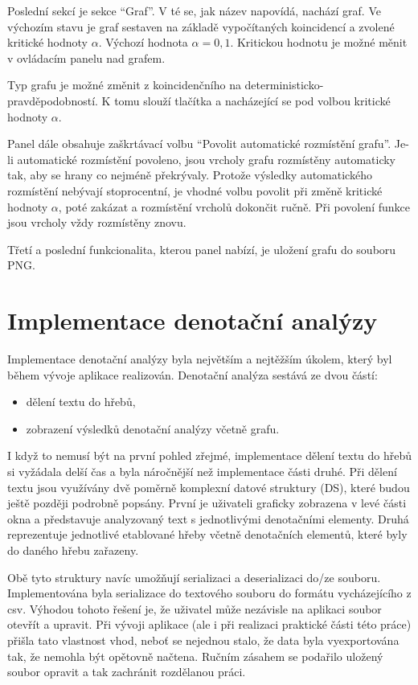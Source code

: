 \documentclass[dp.tex]{subfiles}
\begin{document}
Poslední sekcí je sekce \enquote{Graf}. V té se, jak název napovídá, nachází graf. Ve výchozím stavu je graf sestaven na základě vypočítaných koincidencí a zvolené kritické hodnoty $\alpha$. Výchozí hodnota $\alpha = 0,1$. Kritickou hodnotu je možné měnit v ovládacím panelu nad grafem. 

Typ grafu je možné změnit z koincidenčního na deterministicko-pravděpodobností. K tomu slouží tlačítka  a  nacházející se pod volbou kritické hodnoty $\alpha$. 

Panel dále obsahuje zaškrtávací volbu \enquote{Povolit automatické rozmístění grafu}. Je-li automatické rozmístění povoleno, jsou vrcholy grafu rozmístěny automaticky tak, aby se hrany co nejméně překrývaly. Protože výsledky automatického rozmístění nebývají stoprocentní, je vhodné volbu povolit při změně kritické hodnoty $\alpha$, poté zakázat a rozmístění vrcholů dokončit ručně. Při povolení funkce jsou vrcholy vždy rozmístěny znovu.

Třetí a poslední funkcionalita, kterou panel nabízí, je uložení grafu do souboru PNG.

\section{Implementace denotační analýzy}

Implementace denotační analýzy byla největším a nejtěžším úkolem, který byl během vývoje aplikace realizován. Denotační analýza sestává ze dvou částí:
\begin{itemize}
\item dělení textu do hřebů,
\item zobrazení výsledků denotační analýzy včetně grafu.
\end{itemize}

I když to nemusí být na první pohled zřejmé, implementace dělení textu do hřebů si vyžádala delší čas a byla náročnější než implementace části druhé. Při dělení textu jsou využívány dvě poměrně komplexní datové struktury (DS), které budou ještě později podrobně popsány. První je uživateli graficky zobrazena v levé části okna a představuje analyzovaný text s jednotlivými denotačními elementy. Druhá reprezentuje jednotlivé etablované hřeby včetně \mbox{denotačních} elementů, které byly do daného hřebu zařazeny. 

Obě tyto struktury navíc umožňují serializaci a deserializaci do/ze souboru. Implementována byla serializace do textového souboru do formátu vycházejícího z \acrshort{csv}. Výhodou tohoto řešení je, že uživatel může nezávisle na aplikaci soubor otevřít a upravit. Při vývoji aplikace (ale i při realizaci praktické části této práce) přišla tato vlastnost vhod, neboť se nejednou stalo, že data byla vyexportována tak, že nemohla být opětovně načtena. Ručním zásahem se podařilo uložený soubor opravit a tak zachránit rozdělanou práci.
\end{document}
